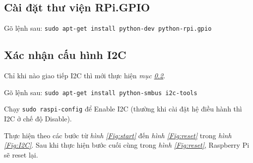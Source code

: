 \subsection{Cài đặt thư viện RPi.GPIO}
Gõ lệnh sau: \verb|sudo apt-get install python-dev python-rpi.gpio|
\subsection{Xác nhận cấu hình I2C}\label{Sub:I2C}
Chỉ khi nào giao tiếp I2C thì mới thực hiện \textit{mục \ref{Sub:I2C}}.

Gõ lệnh sau: \verb|sudo apt-get install python-smbus i2c-tools|

Chạy \verb|sudo raspi-config| để Enable I2C (thường khi cài đặt hệ điều hành thì I2C ở chế độ Disable).

Thực hiện theo các bước từ \textit{hình \ref{Fig:start}} đến \textit{hình \ref{Fig:reset}} trong \textit{hình \ref{Fig:I2C}}. Sau khi thực hiện bước cuối cùng trong \textit{hình \ref{Fig:reset}}, Raspberry Pi sẽ reset lại.
